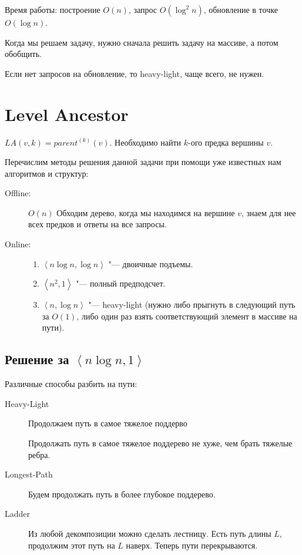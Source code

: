 Время работы: построение $O(n)$, запрос $O(\log^2 n)$, обновление в точке $O(\log n)$.

\begin{Rem}
	Когда мы решаем задачу, нужно сначала решить задачу на массиве, а потом обобщить.
\end{Rem}
\begin{Rem}
Если нет запросов на обновление, то heavy-light, чаще всего, не нужен.
\end{Rem}
\section{Level Ancestor}

\begin{Def}

	$ LA(v, k) = parent^{(k)}(v)$.
	Необходимо найти $k$-ого предка вершины $v$.
\end{Def}


Перечислим методы решения данной задачи при помощи уже известных нам алгоритмов и структур:
\begin{description}
\item[Offline:]
	$O(n)$
	Обходим дерево, когда мы находимся на вершине $v$, знаем для нее всех предков и ответы на все запросы.

\item[Online:]
	\begin{enumerate}
	\item
		$\left<n\log n, \log n\right>$ "--- двоичные подъемы.

	\item
		$\left<n^2, 1\right>$ "--- полный предподсчет.

	\item
		$\left<n, \log n\right>$ "--- heavy-light (нужно либо прыгнуть в следующий путь за $O(1)$,
		либо один раз взять соответствующий элемент в массиве на пути).
	\end{enumerate}
\end{description}

\subsection{Решение за \texorpdfstring{$\left<n\log n, 1\right>$}{<n log n, 1>}}

Различные способы разбить на пути:
\begin{description}
	\item[Heavy-Light] Продолжаем путь в самое тяжелое поддерво
	\begin{Rem}
	    Продолжать путь в самое тяжелое поддерево не хуже, чем брать тяжелые ребра.
	\end{Rem}
	\item[Longest-Path] Будем продолжать путь в более глубокое поддерево.
	\item[Ladder] Из любой декомпозиции можно сделать лестницу. Есть путь длины $L$, продолжим этот путь на $L$ наверх. Теперь пути перекрываются.
\end{description}

